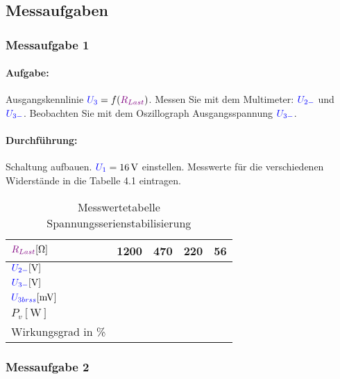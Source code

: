 \documentclass[11pt,a4paper,titlepage]{scrreprt}
\newcommand{\spannung}[1]{\textcolor{blue}{#1}}
\newcommand{\widerstand}[1]{\textcolor{violet}{#1}}
\begin{document}
            \subsection{Messaufgaben}
            \subsubsection{Messaufgabe 1}
            \paragraph{Aufgabe:}  Ausgangskennlinie $\spannung{U_3} = f(\widerstand{R_{Last}})$. Messen Sie mit dem Multimeter: $\spannung{U_{2-}}$ und $\spannung{U_{3-}}$. Beobachten Sie mit dem Oszillograph Ausgangsspannung $\spannung{U_{3-}}$.
            
            \paragraph{Durchführung:} Schaltung aufbauen. $\spannung{U_1} = \SI{16}{\volt}$ einstellen. Messwerte für die verschiedenen Widerstände in die Tabelle 4.1 eintragen.
            
            \begin{table}[!hbtp]
                \caption{Messwertetabelle Spannungsserienstabilisierung}
                \label{tbl:messergebnisse4.1}
                \renewcommand{\arraystretch}{1.3}
                \begin{center}
                    \begin{tabular}{l|cccc}
                        $\widerstand{R_{Last}} [\si{\ohm}]$ & 1200 & 470 & 220 & 56 \\ \hline
                        $\spannung{U_{2-}} [\si{\volt}]$  &  &  &  &\\
                        $\spannung{U_{3-}} [\si{\volt}]$ &  &  &  & \\
                        $\spannung{U_{3brss}} [\si{\milli\volt}]$ &  &  &  &  \\
                        $P_v [\si{\watt}]$ &   &   &   &  \\
                        Wirkungsgrad in \% &  &  &   &  \\
                    \end{tabular}
                \end{center}
            \end{table}
            
            \subsubsection{Messaufgabe 2}
\end{document}
